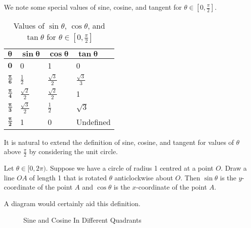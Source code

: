 We note some special values of sine, cosine, and tangent for $\theta \in [0, \frac\pi2]$.

\begin{table}[H]
    \centering
    \begin{tabular}{|l|l|l|l|}
        \hline
        $\boldsymbol{\theta}$ & $\boldsymbol{\sin\theta}$ & $\boldsymbol{\cos\theta}$ & $\boldsymbol{\tan\theta}$ \\ \hline
        $\boldsymbol{0}$ & 0 & 1 & 0 \\ \hline
        $\boldsymbol{\frac\pi6}$ & $\frac12$ & $\frac{\sqrt3}2$ & $\frac{\sqrt3}3$ \\ \hline
        $\boldsymbol{\frac\pi4}$ & $\frac{\sqrt2}2$ & $\frac{\sqrt2}2$ & 1 \\ \hline
        $\boldsymbol{\frac\pi3}$ & $\frac{\sqrt3}2$ & $\frac12$ & $\sqrt3$ \\ \hline
        $\boldsymbol{\frac\pi2}$ & 1 & 0 & Undefined \\ \hline
    \end{tabular}
    \caption{Values of $\sin\theta$, $\cos\theta$, and $\tan\theta$ for $\theta \in [0, \frac\pi2]$}
\end{table}

It is natural to extend the definition of sine, cosine, and tangent for values of $\theta$ above $\frac\pi2$ by considering the unit circle.

\begin{definition}
    Let $\theta \in [0, 2\pi)$. Suppose we have a circle of radius 1 centred at a point $O$. Draw a line $OA$ of length 1 that is rotated $\theta$ anticlockwise about $O$. Then $\sin\theta$ is the $y$-coordinate of the point $A$ and  $\cos\theta$ is the $x$-coordinate of the point $A$.
\end{definition}

A diagram would certainly aid this definition.

\begin{figure}[H]
    \centering
    \caption{Sine and Cosine In Different Quadrants}
\end{figure}

